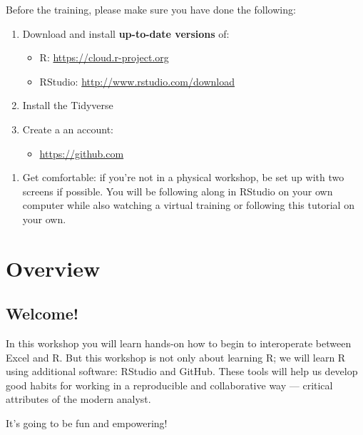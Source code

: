 \documentclass[]{book}
\providecommand{\tightlist}{%
  \setlength{\itemsep}{0pt}\setlength{\parskip}{0pt}}
\begin{document}
Before the training, please make sure you have done the following:

\begin{enumerate}
\def\labelenumi{\arabic{enumi}.}
\tightlist
\item
  Download and install \textbf{up-to-date versions} of:

  \begin{itemize}
  \tightlist
  \item
    R: \url{https://cloud.r-project.org}
  \item
    RStudio: \url{http://www.rstudio.com/download}
  \end{itemize}
\item
  Install the Tidyverse
\item
  Create a an account:

  \begin{itemize}
  \tightlist
  \item
    \url{https://github.com}
  \end{itemize}
\end{enumerate}

\begin{enumerate}
\def\labelenumi{\arabic{enumi}.}
\tightlist
\item
  Get comfortable: if you're not in a physical workshop, be set up with two screens if possible. You will be following along in RStudio on your own computer while also watching a virtual training or following this tutorial on your own.
\end{enumerate}

\hypertarget{overview}{%
\chapter{Overview}\label{overview}}

\hypertarget{welcome-1}{%
\section{Welcome!}\label{welcome-1}}

In this workshop you will learn hands-on how to begin to interoperate between Excel and R. But this workshop is not only about learning R; we will learn R using additional software: RStudio and GitHub. These tools will help us develop good habits for working in a reproducible and collaborative way --- critical attributes of the modern analyst.

It's going to be fun and empowering!
\end{document}
